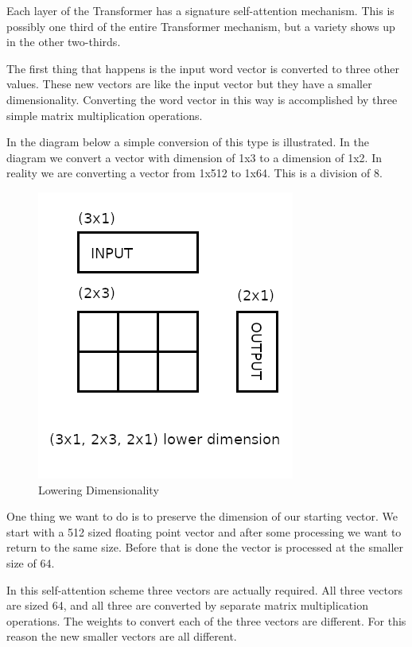 Each layer of the Transformer has a signature self-attention mechanism. This is possibly one third of the entire Transformer mechanism, but a variety shows up in the other two-thirds. 

The first thing that happens is the input word vector is converted to three other values. These new vectors are like the input vector but they have a smaller dimensionality. Converting the word vector in this way is accomplished by three simple matrix multiplication operations.

In the diagram below a simple conversion of this type is illustrated. In the diagram we convert a vector with dimension of 1x3 to a dimension of 1x2. In reality we are converting a vector from 1x512 to 1x64. This is a division of 8.



\begin{figure}[H]
	\begin{center}
		
	
	\includegraphics[scale=0.5]{diagram-mat01}
\end{center}
	\caption[Lowering Dimensionality]{Lowering Dimensionality}
	
\end{figure}


One thing we want to do is to preserve the dimension of our starting vector. We start with a 512 sized floating point vector and after some processing we want to return to the same size. Before that is done the vector is processed at the smaller size of 64. 

In this self-attention scheme three vectors are actually required. All three vectors are sized 64, and all three are converted by separate matrix multiplication operations. The weights to convert each of the three vectors are different. For this reason the new smaller vectors are all different.

